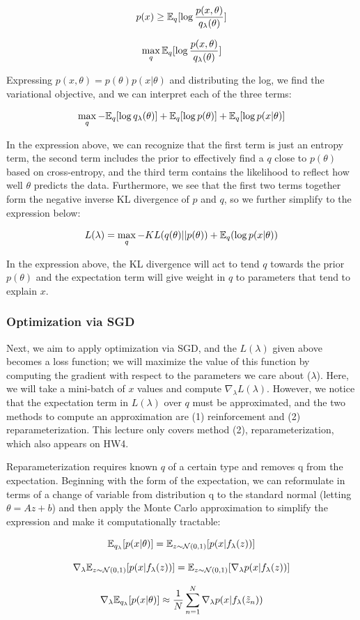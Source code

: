 \documentclass{article}
\begin{document}
$$
p(x) \geq \mathbb{E}_q [\log{\frac{p(x, \theta)}{q_{\lambda}(\theta)}} ]
$$

$$
\max_{q} \mathbb{E}_q [\log{\frac{p(x, \theta)}{q_{\lambda}(\theta)}} ]
$$

Expressing $p(x, \theta) = p(\theta) p(x|\theta)$ and distributing the log, we find the variational objective, and we can interpret each of the three terms:

$$
\max_{q} - \mathbb{E}_q [\log{q_{\lambda}(\theta)} ] + \mathbb{E}_q [\log{p(\theta)} ] + \mathbb{E}_q [\log{p(x|\theta)} ]
$$

In the expression above, we can recognize that the first term is just an entropy term, the second term includes the prior to effectively find a $q$ close to $p(\theta)$ based on cross-entropy, and the third term contains the likelihood to reflect how well $\theta$ predicts the data.  
Furthermore, we see that the first two terms together form the negative inverse KL divergence of $p$ and $q$, so we further simplify to the expression below:

$$
L(\lambda) = \max_{q} - KL(q(\theta) || p(\theta)) + \mathbb{E}_q (\log{p(x|\theta)})
$$

In the expression above, the KL divergence will act to tend $q$ towards the prior $p(\theta)$ and the expectation term will give weight in $q$ to parameters that tend to explain $x$.

\subsubsection{Optimization via SGD}

Next, we aim to apply optimization via SGD, and the $L(\lambda)$ given above becomes a loss function; we will maximize the value of this function by computing the gradient with respect to the parameters we care about ($\lambda$).  
Here, we will take a mini-batch of $x$ values and compute $\nabla_{\lambda} L(\lambda)$.  
However, we notice that the expectation term in $L(\lambda)$ over $q$ must be approximated, and the two methods to compute an approximation are (1) reinforcement and (2) reparameterization.
This lecture only covers method (2), reparameterization, which also appears on HW4.

Reparameterization requires known $q$ of a certain type and removes q from the expectation.  
Beginning with the form of the expectation, we can reformulate in terms of a change of variable from distribution q to the standard normal (letting $\theta = Az+b$) and then apply the Monte Carlo approximation to simplify the expression and make it computationally tractable:

$$
\mathbb{E}_{q_{\lambda}} [p(x|\theta)] = \mathbb{E}_{z \sim \mathcal{N}(0,1)} [p(x|f_{\lambda}(z))]
$$

$$
\nabla_{\lambda} \mathbb{E}_{z \sim \mathcal{N}(0,1)} [p(x|f_{\lambda}(z))] = \mathbb{E}_{z \sim \mathcal{N}(0,1)} [ \nabla_{\lambda} p(x|f_{\lambda}(z))]
$$

$$
\nabla_{\lambda} \mathbb{E}_{q_{\lambda}} [p(x|\theta)] \approx \frac{1}{N} \sum_{n=1}^{N} \nabla_{\lambda} p(x|f_{\lambda}(\tilde{z}_n))
$$
\end{document}
